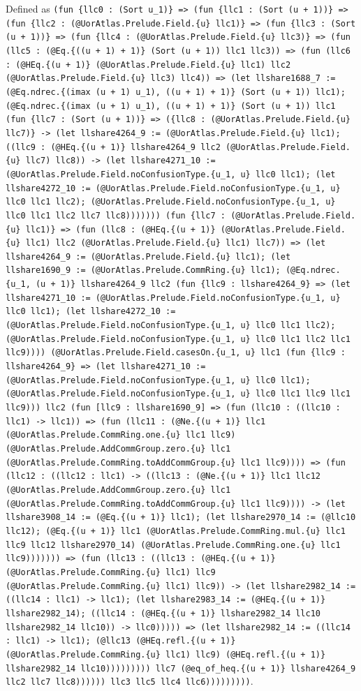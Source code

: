 \documentclass[11pt]{article}
\begin{document}
\noindent Defined as \texttt{(fun \{llc0 : (Sort u\_1)\} => (fun \{llc1 : (Sort (u + 1))\} => (fun \{llc2 : (@UorAtlas.Prelude.Field.\{u\} llc1)\} => (fun \{llc3 : (Sort (u + 1))\} => (fun \{llc4 : (@UorAtlas.Prelude.Field.\{u\} llc3)\} => (fun (llc5 : (@Eq.\{((u + 1) + 1)\} (Sort (u + 1)) llc1 llc3)) => (fun (llc6 : (@HEq.\{(u + 1)\} (@UorAtlas.Prelude.Field.\{u\} llc1) llc2 (@UorAtlas.Prelude.Field.\{u\} llc3) llc4)) => (let llshare1688\_7 := (@Eq.ndrec.\{(imax (u + 1) u\_1), ((u + 1) + 1)\} (Sort (u + 1)) llc1); (@Eq.ndrec.\{(imax (u + 1) u\_1), ((u + 1) + 1)\} (Sort (u + 1)) llc1 (fun \{llc7 : (Sort (u + 1))\} => (\{llc8 : (@UorAtlas.Prelude.Field.\{u\} llc7)\} -> (let llshare4264\_9 := (@UorAtlas.Prelude.Field.\{u\} llc1); ((llc9 : (@HEq.\{(u + 1)\} llshare4264\_9 llc2 (@UorAtlas.Prelude.Field.\{u\} llc7) llc8)) -> (let llshare4271\_10 := (@UorAtlas.Prelude.Field.noConfusionType.\{u\_1, u\} llc0 llc1); (let llshare4272\_10 := (@UorAtlas.Prelude.Field.noConfusionType.\{u\_1, u\} llc0 llc1 llc2); (@UorAtlas.Prelude.Field.noConfusionType.\{u\_1, u\} llc0 llc1 llc2 llc7 llc8))))))) (fun \{llc7 : (@UorAtlas.Prelude.Field.\{u\} llc1)\} => (fun (llc8 : (@HEq.\{(u + 1)\} (@UorAtlas.Prelude.Field.\{u\} llc1) llc2 (@UorAtlas.Prelude.Field.\{u\} llc1) llc7)) => (let llshare4264\_9 := (@UorAtlas.Prelude.Field.\{u\} llc1); (let llshare1690\_9 := (@UorAtlas.Prelude.CommRing.\{u\} llc1); (@Eq.ndrec.\{u\_1, (u + 1)\} llshare4264\_9 llc2 (fun \{llc9 : llshare4264\_9\} => (let llshare4271\_10 := (@UorAtlas.Prelude.Field.noConfusionType.\{u\_1, u\} llc0 llc1); (let llshare4272\_10 := (@UorAtlas.Prelude.Field.noConfusionType.\{u\_1, u\} llc0 llc1 llc2); (@UorAtlas.Prelude.Field.noConfusionType.\{u\_1, u\} llc0 llc1 llc2 llc1 llc9)))) (@UorAtlas.Prelude.Field.casesOn.\{u\_1, u\} llc1 (fun \{llc9 : llshare4264\_9\} => (let llshare4271\_10 := (@UorAtlas.Prelude.Field.noConfusionType.\{u\_1, u\} llc0 llc1); (@UorAtlas.Prelude.Field.noConfusionType.\{u\_1, u\} llc0 llc1 llc9 llc1 llc9))) llc2 (fun [llc9 : llshare1690\_9] => (fun (llc10 : ((llc10 : llc1) -> llc1)) => (fun (llc11 : (@Ne.\{(u + 1)\} llc1 (@UorAtlas.Prelude.CommRing.one.\{u\} llc1 llc9) (@UorAtlas.Prelude.AddCommGroup.zero.\{u\} llc1 (@UorAtlas.Prelude.CommRing.toAddCommGroup.\{u\} llc1 llc9)))) => (fun (llc12 : ((llc12 : llc1) -> ((llc13 : (@Ne.\{(u + 1)\} llc1 llc12 (@UorAtlas.Prelude.AddCommGroup.zero.\{u\} llc1 (@UorAtlas.Prelude.CommRing.toAddCommGroup.\{u\} llc1 llc9)))) -> (let llshare3908\_14 := (@Eq.\{(u + 1)\} llc1); (let llshare2970\_14 := (@llc10 llc12); (@Eq.\{(u + 1)\} llc1 (@UorAtlas.Prelude.CommRing.mul.\{u\} llc1 llc9 llc12 llshare2970\_14) (@UorAtlas.Prelude.CommRing.one.\{u\} llc1 llc9))))))) => (fun (llc13 : ((llc13 : (@HEq.\{(u + 1)\} (@UorAtlas.Prelude.CommRing.\{u\} llc1) llc9 (@UorAtlas.Prelude.CommRing.\{u\} llc1) llc9)) -> (let llshare2982\_14 := ((llc14 : llc1) -> llc1); (let llshare2983\_14 := (@HEq.\{(u + 1)\} llshare2982\_14); ((llc14 : (@HEq.\{(u + 1)\} llshare2982\_14 llc10 llshare2982\_14 llc10)) -> llc0))))) => (let llshare2982\_14 := ((llc14 : llc1) -> llc1); (@llc13 (@HEq.refl.\{(u + 1)\} (@UorAtlas.Prelude.CommRing.\{u\} llc1) llc9) (@HEq.refl.\{(u + 1)\} llshare2982\_14 llc10))))))))) llc7 (@eq\_of\_heq.\{(u + 1)\} llshare4264\_9 llc2 llc7 llc8)))))) llc3 llc5 llc4 llc6)))))))))}.\par
\end{document}
